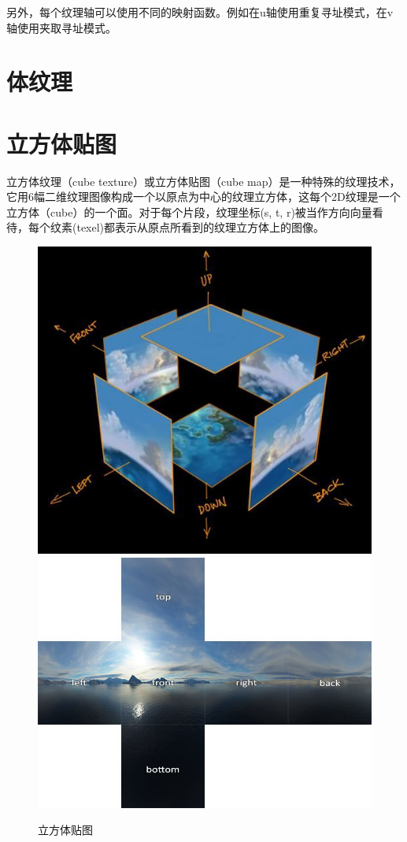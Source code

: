 \documentclass[UTF8,a4paper,12pt]{ctexbook}
\begin{document}
		另外，每个纹理轴可以使用不同的映射函数。例如在u轴使用重复寻址模式，在v轴使用夹取寻址模式。
		
	\section{体纹理}
	
	\section{立方体贴图}
		立方体纹理（cube texture）或立方体贴图（cube map）是一种特殊的纹理技术，它用6幅二维纹理图像构成一个以原点为中心的纹理立方体，这每个2D纹理是一个立方体（cube）的一个面。对于每个片段，纹理坐标(s, t, r)被当作方向向量看待，每个纹素(texel)都表示从原点所看到的纹理立方体上的图像。
		
			\begin{figure}[H]
				\centering
				\includegraphics[scale=0.57]{cubeMap}
				\includegraphics[scale=0.57]{cubeMap1}
				\caption{立方体贴图}
			\end{figure}
		
\end{document}
